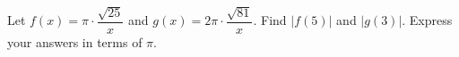 Let $f(x)=\pi\cdot\dfrac{\sqrt{25}}{x}$ and $g(x)=2\pi\cdot\dfrac{\sqrt{81}}{x}$. Find $|f(5)|$ and $|g(3)|$. Express your answers in terms of $\pi$.
